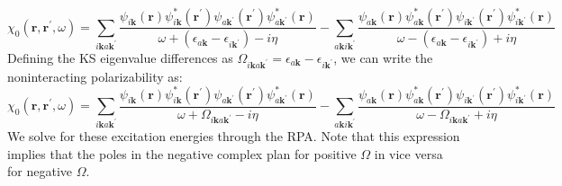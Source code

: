 \documentclass[12pt]{article}
\begin{document}
\begin{equation}
\chi_{0}\left(\mathbf{r}, \mathbf{r}^{\prime}, \omega\right)=\sum_{i\mathbf{k}a\mathbf{k}^{\prime}}\frac{\psi_{i\mathbf{k} }(\mathbf{r}) \psi_{i\mathbf{k}}^{*}\left(\mathbf{r}^{\prime}\right) \psi_{a\mathbf{k}^{\prime}}\left(\mathbf{r}^{\prime}\right) \psi_{a\mathbf{k}^{\prime}}^{*}(\mathbf{r})}{\omega+\left(\epsilon_{a\mathbf{k}}-\epsilon_{i\mathbf{k}^{\prime}}\right)-i\eta } - \sum_{a\mathbf{k}i\mathbf{k}^{\prime}}\frac{\psi_{a\mathbf{k}}(\mathbf{r}) \psi_{a\mathbf{k}}^{*}\left(\mathbf{r}^{\prime}\right) \psi_{i\mathbf{k}^{\prime}}\left(\mathbf{r}^{\prime}\right) \psi_{i\mathbf{k}^{\prime}}^{*}(\mathbf{r})}{\omega-\left(\epsilon_{a\mathbf{k}}-\epsilon_{i\mathbf{k}^{\prime}}\right)+i\eta }
\end{equation}
Defining the KS eigenvalue differences as \(\Omega_{i\mathbf{k}a\mathbf{k}^{\prime}} = \epsilon_{a\mathbf{k}} - \epsilon_{i\mathbf{k}^{\prime}}\), we can write the noninteracting polarizability as:
\begin{equation}
\chi_{0}\left(\mathbf{r}, \mathbf{r}^{\prime}, \omega\right)=\sum_{i\mathbf{k}a\mathbf{k}^{\prime}}\frac{\psi_{i\mathbf{k} }(\mathbf{r}) \psi_{i\mathbf{k}}^{*}\left(\mathbf{r}^{\prime}\right) \psi_{a\mathbf{k}^{\prime}}\left(\mathbf{r}^{\prime}\right) \psi_{a\mathbf{k}^{\prime}}^{*}(\mathbf{r})}{\omega+\Omega_{i\mathbf{k}a\mathbf{k}^{\prime}}-i\eta } - \sum_{a\mathbf{k}i\mathbf{k}^{\prime}}\frac{\psi_{a\mathbf{k}}(\mathbf{r}) \psi_{a\mathbf{k}}^{*}\left(\mathbf{r}^{\prime}\right) \psi_{i\mathbf{k}^{\prime}}\left(\mathbf{r}^{\prime}\right) \psi_{i\mathbf{k}^{\prime}}^{*}(\mathbf{r})}{\omega-\Omega_{i\mathbf{k}a\mathbf{k}^{\prime}}+i\eta }
\end{equation}
We solve for these excitation energies through the RPA. Note that this expression implies that the poles in the negative complex plan for positive $\Omega $ in vice versa for negative $\Omega $.
\end{document}
